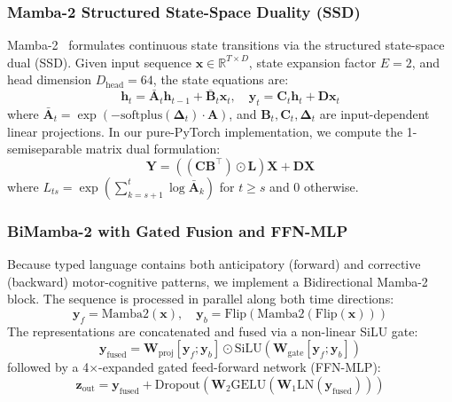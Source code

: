 \documentclass[conference]{IEEEtran}
\begin{document}
\subsubsection{Mamba-2 Structured State-Space Duality (SSD)}
Mamba-2~\cite{mamba2} formulates continuous state transitions via the structured state-space dual (SSD). Given input sequence $\mathbf{x} \in \mathbb{R}^{T \times D}$, state expansion factor $E=2$, and head dimension $D_{\text{head}}=64$, the state equations are:
\begin{equation}
    \mathbf{h}_t = \bar{\mathbf{A}}_t \mathbf{h}_{t-1} + \bar{\mathbf{B}}_t \mathbf{x}_t, \quad \mathbf{y}_t = \mathbf{C}_t \mathbf{h}_t + \mathbf{D} \mathbf{x}_t
\end{equation}
where $\bar{\mathbf{A}}_t = \exp(-\text{softplus}(\boldsymbol{\Delta}_t) \cdot \mathbf{A})$, and $\mathbf{B}_t, \mathbf{C}_t, \boldsymbol{\Delta}_t$ are input-dependent linear projections. In our pure-PyTorch implementation, we compute the 1-semiseparable matrix dual formulation:
\begin{equation}
    \mathbf{Y} = \left( (\mathbf{C} \mathbf{B}^\top) \odot \mathbf{L} \right) \mathbf{X} + \mathbf{D} \mathbf{X}
\end{equation}
where $L_{ts} = \exp\left(\sum_{k=s+1}^{t} \log \bar{\mathbf{A}}_k\right)$ for $t \geq s$ and $0$ otherwise.

\subsubsection{BiMamba-2 with Gated Fusion and FFN-MLP}
Because typed language contains both anticipatory (forward) and corrective (backward) motor-cognitive patterns, we implement a Bidirectional Mamba-2 block. The sequence is processed in parallel along both time directions:
\begin{equation}
    \mathbf{y}_f = \text{Mamba2}(\mathbf{x}), \quad \mathbf{y}_b = \text{Flip}\left(\text{Mamba2}(\text{Flip}(\mathbf{x}))\right)
\end{equation}
The representations are concatenated and fused via a non-linear SiLU gate:
\begin{equation}
    \mathbf{y}_{\text{fused}} = \mathbf{W}_{\text{proj}}[\mathbf{y}_f; \mathbf{y}_b] \odot \text{SiLU}\left(\mathbf{W}_{\text{gate}}[\mathbf{y}_f; \mathbf{y}_b]\right)
\end{equation}
followed by a 4$\times$-expanded gated feed-forward network (FFN-MLP):
\begin{equation}
    \mathbf{z}_{\text{out}} = \mathbf{y}_{\text{fused}} + \text{Dropout}\left(\mathbf{W}_2 \text{GELU}(\mathbf{W}_1 \text{LN}(\mathbf{y}_{\text{fused}}))\right)
\end{equation}
\end{document}
